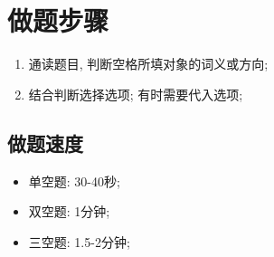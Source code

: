 \chapter{做题步骤}

\begin{enumerate}
  \item 通读题目, 判断空格所填对象的词义或方向;
  \item 结合判断选择选项; 有时需要代入选项;
\end{enumerate}

\section{做题速度}

  \begin{itemize}
    \item 单空题: 30-40秒;
    \item 双空题: 1分钟;
    \item 三空题: 1.5-2分钟;
  \end{itemize}

